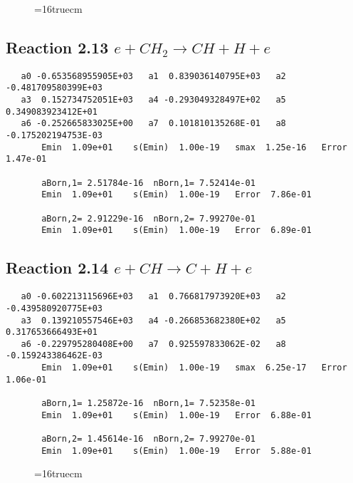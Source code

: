 \documentclass[12pt]{article}
\begin{document}
\begin{figure} \label{met.1_2.11}
\epsfxsize=16truecm
\end{figure}
\newpage

\subsection{ 
Reaction 2.13     $e + CH_2 \rightarrow CH + H + e$
}

\begin{small}\begin{verbatim} 
   a0 -0.653568955905E+03   a1  0.839036140795E+03   a2 -0.481709580399E+03
   a3  0.152734752051E+03   a4 -0.293049328497E+02   a5  0.349083923412E+01
   a6 -0.252665833025E+00   a7  0.101810135268E-01   a8 -0.175202194753E-03
       Emin  1.09e+01    s(Emin)  1.00e-19   smax  1.25e-16   Error  1.47e-01
 
       aBorn,1= 2.51784e-16  nBorn,1= 7.52414e-01
       Emin  1.09e+01    s(Emin)  1.00e-19   Error  7.86e-01
 
       aBorn,2= 2.91229e-16  nBorn,2= 7.99270e-01
       Emin  1.09e+01    s(Emin)  1.00e-19   Error  6.89e-01
\end{verbatim}\end{small} 

\subsection{
Reaction 2.14     $e + CH \rightarrow C + H + e$
}

\begin{small}\begin{verbatim} 
   a0 -0.602213115696E+03   a1  0.766817973920E+03   a2 -0.439580920775E+03
   a3  0.139210557546E+03   a4 -0.266853682380E+02   a5  0.317653666493E+01
   a6 -0.229795280408E+00   a7  0.925597833062E-02   a8 -0.159243386462E-03
       Emin  1.09e+01    s(Emin)  1.00e-19   smax  6.25e-17   Error  1.06e-01
 
       aBorn,1= 1.25872e-16  nBorn,1= 7.52358e-01
       Emin  1.09e+01    s(Emin)  1.00e-19   Error  6.88e-01
 
       aBorn,2= 1.45614e-16  nBorn,2= 7.99270e-01
       Emin  1.09e+01    s(Emin)  1.00e-19   Error  5.88e-01
\end{verbatim}\end{small}

\begin{figure} \label{met.1_2.13}
\epsfxsize=16truecm
\end{figure}
\newpage
 
\end{document}
